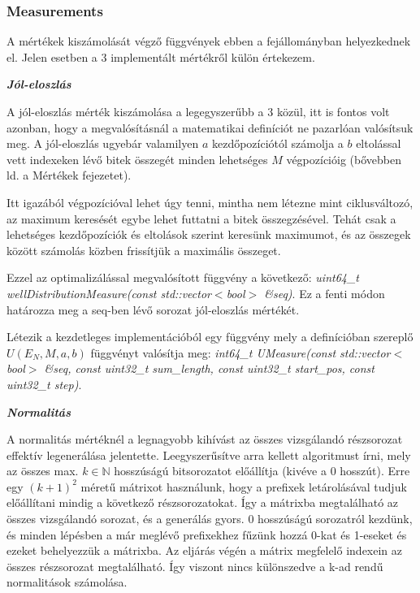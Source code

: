 \documentclass[12pt]{article}
\begin{document}
\subsubsection*{Measurements}
A mértékek kiszámolását végző függvények ebben a fejállományban helyezkednek el. Jelen esetben a 3 implementált mértékről külön értekezem.

\textit{\textbf{Jól-eloszlás}}

A jól-eloszlás mérték kiszámolása a legegyszerűbb a 3 közül, itt is fontos volt azonban, hogy a megvalósításnál a matematikai definíciót ne pazarlóan valósítsuk meg. A jól-eloszlás ugyebár valamilyen $a$ kezdőpozíciótól számolja a $b$ eltolással vett indexeken lévő bitek összegét minden lehetséges $M$ végpozícióig (bővebben ld. a Mértékek fejezetet).

Itt igazából végpozícióval lehet úgy tenni, mintha nem létezne mint ciklusváltozó, az maximum keresését egybe lehet futtatni a bitek összegzésével. Tehát csak a lehetséges kezdőpozíciók és eltolások szerint keresünk maximumot, és az összegek között számolás közben frissítjük a maximális összeget. 

Ezzel az optimalizálással megvalósított függvény a következő: \textit{uint64\_t wellDistributionMeasure(const std::vector$<$bool$>$ \&seq)}. Ez a fenti módon határozza meg a seq-ben lévő sorozat jól-eloszlás mértékét.

Létezik a kezdetleges implementációból egy függvény mely a definícióban szereplő $U(E_N, M, a, b)$ függvényt valósítja meg: \textit{int64\_t UMeasure(const std::vector$<$bool$>$ \&seq, const uint32\_t sum\_length, const uint32\_t start\_pos, const uint32\_t step)}.

\textit{\textbf{Normalitás}}

A normalitás mértéknél a legnagyobb kihívást az összes vizsgálandó részsorozat effektív legenerálása jelentette. Leegyszerűsítve arra kellett algoritmust írni, mely az összes max. $k \in \mathbb{N}$ hosszúságú bitsorozatot előállítja (kivéve a 0 hosszút). Erre egy $(k+1)^2$ méretű mátrixot használunk, hogy a prefixek letárolásával tudjuk előállítani mindig a következő részsorozatokat. Így a mátrixba megtalálható az összes vizsgálandó sorozat, és a generálás gyors. 0 hosszúságú sorozatról kezdünk, és minden lépésben a már meglévő prefixekhez fűzünk hozzá 0-kat és 1-eseket és ezeket behelyezzük a mátrixba. Az eljárás végén a mátrix megfelelő indexein az összes részsorozat megtalálható. Így viszont nincs különszedve a k-ad rendű normalitások számolása.
\end{document}
